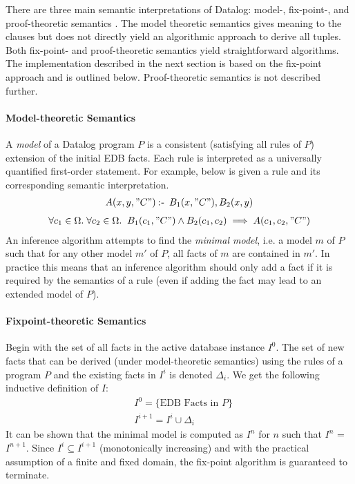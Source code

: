 There are three main semantic interpretations of Datalog: model-, fix-point-, and proof-theoretic semantics \cite{Green:2013:DRQ:2688167.2688168}. The model theoretic semantics gives meaning to the clauses but does not directly yield an algorithmic approach to derive all tuples. Both fix-point- and proof-theoretic semantics yield straightforward algorithms. The implementation described in the next section is based on the fix-point approach and is outlined below. Proof-theoretic semantics is not described further.

\paragraph{Model-theoretic Semantics}\NL
A \textit{model} of a Datalog program $P$ is a consistent (satisfying all rules of $P$) extension of the initial EDB facts. Each rule is interpreted as a universally quantified first-order statement. For example, below is given a rule and its corresponding semantic interpretation. 
\begin{align*}
A(x, y, "C") \mathbin{:\hspace{-0.5ex}\textsf{-}} \;B_1(x, "C"), B_2(x, y)
\end{align*}
\vspace*{-20pt}
\begin{align*}
\forall c_1 \in \Omega.\;\forall c_2 \in \Omega.\;\; B_1(c_1, "C") \land B_2(c_1,c_2) \implies  A(c_1, c_2, "C")
\end{align*}
\noindent
An inference algorithm attempts to find the \textit{minimal model}, i.e. a model $m$ of $P$ such that for any other model $m'$ of $P$, all facts of $m$ are contained in $m'$. In practice this means that an inference algorithm should only add a fact if it is required by the semantics of a rule (even if adding the fact may lead to an extended model of $P$). 

\paragraph{Fixpoint-theoretic Semantics}\NL
Begin with the set of all facts in the active database instance $I^0$. The set of new facts that can be derived (under model-theoretic semantics) using the rules of a program $P$ and the existing facts in $I^i$ is denoted $\Delta_i$. We get the following inductive definition of $I$:
\begin{align*}
&I^0 = \{ \text{EDB Facts in } P \}\\
&I^{i + 1} = I^i \cup \Delta_i 
\end{align*}
\noindent
It can be shown\cite{Green:2013:DRQ:2688167.2688168} that the minimal model is computed as $I^{n}$ for $n$ such that $I^{n}$ = $I^{n + 1}$. Since $I^i \subseteq I^{i + 1}$ (monotonically increasing) and with the practical assumption of a finite and fixed domain, the fix-point algorithm is guaranteed to terminate. 

